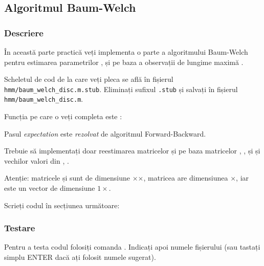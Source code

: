 \documentclass[12pt]{article}
\begin{document}
  
\subsection{Algoritmul Baum-Welch}
\label{sec:baum-welch}

\subsubsection{Descriere}
\label{sec:desc}

În această parte practică veți implementa o parte a algoritmului
Baum-Welch pentru estimarea parametrilor , și
 pe baza a  observații de lungime maximă
.

Scheletul de cod de la care veți pleca se află în fișierul\\
\texttt{hmm/baum\_welch\_disc.m.stub}. Eliminați sufixul
\texttt{.stub} și salvați în fișierul
\texttt{hmm/baum\_welch\_disc.m}.

Funcția pe care o veți completa este :




Pasul \emph{expectation} este \emph{rezolvat} de algoritmul
Forward-Backward.




Trebuie să implementați doar reestimarea matricelor  și
 pe baza matricelor , ,
 și  și vechilor valori din ,
.

Atenție: matricele  și  sunt de dimensiune
$\times$$\times$, matricea  are
dimensiunea $\times$, iar  este un vector de
dimensiune $1\times$.

Scrieți codul în secțiunea următoare:



\subsubsection{Testare}
\label{sec:test-bm}

Pentru a testa codul folosiți comanda
.  Indicați apoi numele
fișierului (sau tastați simplu ENTER dacă ați folosit numele sugerat).
\end{document}
